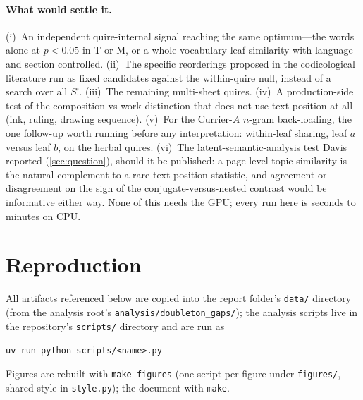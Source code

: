\documentclass[11pt,a4paper]{article}
\begin{document}
\paragraph{What would settle it.} (i)~An independent quire-internal signal reaching the same optimum---the words alone at $p<0.05$ in T or M, or a whole-vocabulary leaf similarity with language and section controlled. (ii)~The specific reorderings proposed in the codicological literature run as fixed candidates against the within-quire null, instead of a search over all $S!$. (iii)~The remaining multi-sheet quires. (iv)~A production-side test of the composition-vs-work distinction that does not use text position at all (ink, ruling, drawing sequence). (v)~For the Currier-$A$ $n$-gram back-loading, the one follow-up worth running before any interpretation: within-leaf sharing, leaf $a$ versus leaf $b$, on the herbal quires. (vi)~The latent-semantic-analysis test Davis reported (\cref{sec:question}), should it be published: a page-level topic similarity is the natural complement to a rare-text position statistic, and agreement or disagreement on the sign of the conjugate-versus-nested contrast would be informative either way. None of this needs the GPU; every run here is seconds to minutes on CPU.

\appendix
\section{Reproduction}
\label{app:repro}

All artifacts referenced below are copied into the report folder's \texttt{data/} directory (from the analysis root's \texttt{analysis/doubleton\_gaps/}); the analysis scripts live in the repository's \texttt{scripts/} directory and are run as
\begin{center}\texttt{uv run python scripts/<name>.py}\end{center}
Figures are rebuilt with \texttt{make figures} (one script per figure under \texttt{figures/}, shared style in \texttt{style.py}); the document with \texttt{make}.
\end{document}
